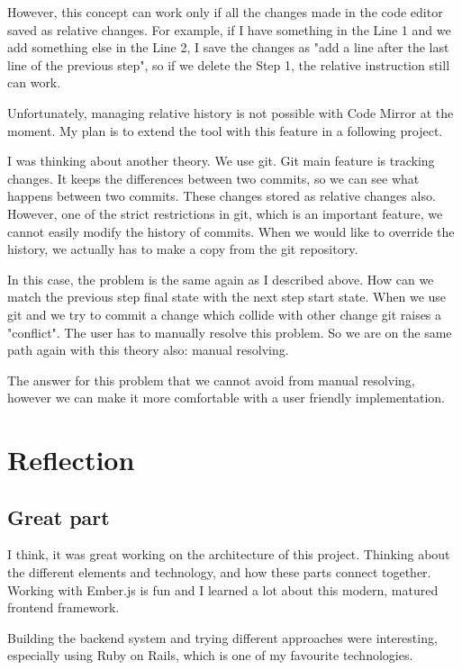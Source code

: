 \documentclass[12pt, a4paper, oneside, openright, medskipamount]{report}
\begin{document}
However, this concept can work only if all the changes made in the code editor saved as relative changes. For example, if I have something in the Line 1 and we add something else in the Line 2, I save the changes as "add a line after the last line of the previous step", so if we delete the Step 1, the relative instruction still can work.

Unfortunately, managing relative history is not possible with Code Mirror at the moment. My plan is to extend the tool with this feature in a following project.

I was thinking about another theory. We use git. Git main feature is tracking changes. It keeps the differences between two commits, so we can see what happens between two commits. These changes stored as relative changes also. However, one of the strict restrictions in git, which is an important feature, we cannot easily modify the history of commits. When we would like to override the history, we actually has to make a copy from the git repository.

In this case, the problem is the same again as I described above. How can we match the previous step final state with the next step start state. When we use git and we try to commit a change which collide with other change git raises a "conflict". The user has to manually resolve this problem. So we are on the same path again with this theory also: manual resolving.

The answer for this problem that we cannot avoid from manual resolving, however we can make it more comfortable with a user friendly implementation.

\section{Reflection}

\subsection{Great part}

I think, it was great working on the architecture of this project. Thinking about the different elements and technology, and how these parts connect together. Working with Ember.js is fun and I learned a lot about this modern, matured frontend framework.

Building the backend system and trying different approaches were interesting, especially using Ruby on Rails, which is one of my favourite technologies.
\end{document}
